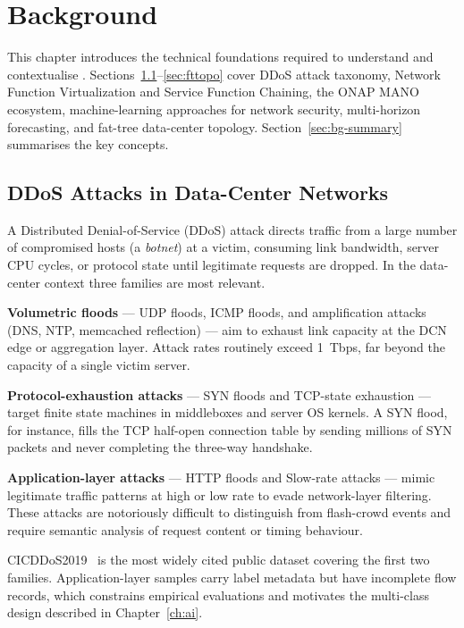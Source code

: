\chapter{Background}
\label{ch:background}

This chapter introduces the technical foundations required to understand
and contextualise \padonap{}. Sections~\ref{sec:ddos-bg}--\ref{sec:fttopo}
cover DDoS attack taxonomy, Network Function Virtualization and Service
Function Chaining, the ONAP MANO ecosystem, machine-learning approaches
for network security, multi-horizon forecasting, and fat-tree data-center
topology. Section~\ref{sec:bg-summary} summarises the key concepts.

\section{DDoS Attacks in Data-Center Networks}
\label{sec:ddos-bg}

A Distributed Denial-of-Service (DDoS) attack directs traffic from a
large number of compromised hosts (a \emph{botnet}) at a victim,
consuming link bandwidth, server CPU cycles, or protocol state until
legitimate requests are dropped. In the data-center context three
families are most relevant.

\textbf{Volumetric floods} --- UDP floods, ICMP floods, and amplification
attacks (DNS, NTP, memcached reflection) --- aim to exhaust link capacity
at the DCN edge or aggregation layer. Attack rates routinely exceed
1~Tbps, far beyond the capacity of a single victim server.

\textbf{Protocol-exhaustion attacks} --- SYN floods and TCP-state
exhaustion --- target finite state machines in middleboxes and server
OS kernels. A SYN flood, for instance, fills the TCP half-open connection
table by sending millions of SYN packets and never completing the
three-way handshake.

\textbf{Application-layer attacks} --- HTTP floods and Slow-rate attacks ---
mimic legitimate traffic patterns at high or low rate to evade network-layer
filtering. These attacks are notoriously difficult to distinguish from
flash-crowd events and require semantic analysis of request content or
timing behaviour.

CICDDoS2019~\citep{sharafaldin2019cicddos} is the most widely cited
public dataset covering the first two families. Application-layer samples
carry label metadata but have incomplete flow records, which constrains
empirical evaluations and motivates the multi-class design described in
Chapter~\ref{ch:ai}.

